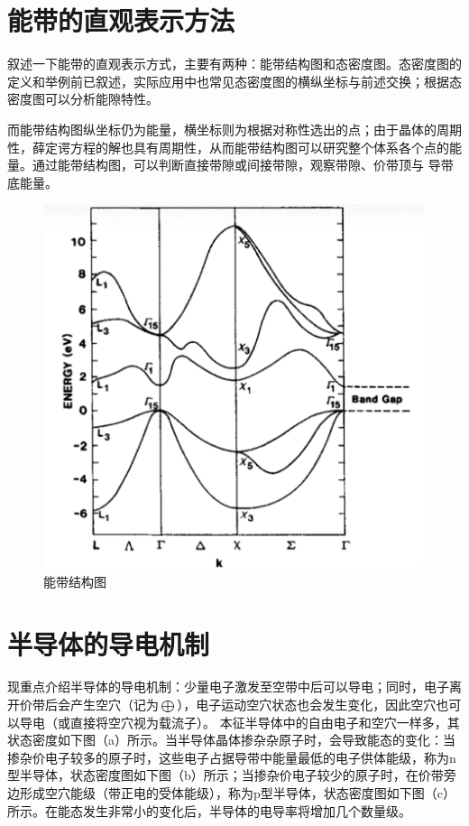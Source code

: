 \section{能带的直观表示方法}

叙述一下能带的直观表示方式，主要有两种：能带结构图和态密度图。态密度图的定义和举例前已叙述，实际应用中也常见态密度图的横纵坐标与前述交换；根据态密度图可以分析能隙特性。

而能带结构图纵坐标仍为能量，横坐标则为根据对称性选出的点；由于晶体的周期性，薛定谔方程的解也具有周期性，从而能带结构图可以研究整个体系各个点的能量。通过能带结构图，可以判断直接带隙或间接带隙，观察带隙、价带顶与
导带底能量。

\begin{figure}
    \centering
    \includegraphics[scale=0.5]{img/能带结构图.png}
    \caption{能带结构图}
\end{figure}

\section{半导体的导电机制}

现重点介绍半导体的导电机制：少量电子激发至空带中后可以导电；同时，电子离开价带后会产生空穴（记为$\bigoplus$），电子运动空穴状态也会发生变化，因此空穴也可以导电（或直接将空穴视为载流子）。
本征半导体中的自由电子和空穴一样多，其状态密度如下图（a）所示。当半导体晶体掺杂杂原子时，会导致能态的变化：当掺杂价电子较多的原子时，这些电子占据导带中能量最低的电子供体能级，称为n型半导体，状态密度图如下图（b）所示；当掺杂价电子较少的原子时，在价带旁边形成空穴能级（带正电的受体能级），称为p型半导体，状态密度图如下图（c）所示。在能态发生非常小的变化后，半导体的电导率将增加几个数量级。

